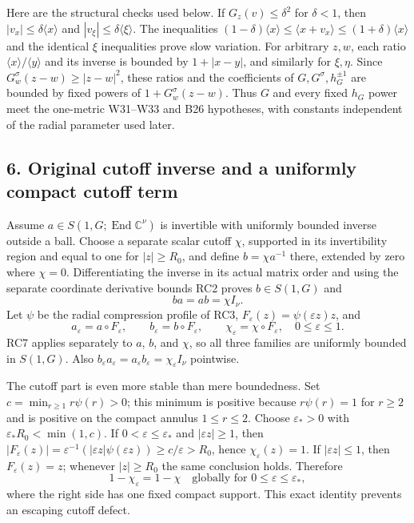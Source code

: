 \documentclass[
  11pt,
]{article}
\begin{document}
Here are the structural checks used below. If \(G_z(v)\le\delta^2\) for
\(\delta<1\), then \(|v_x|\le\delta\langle x\rangle\) and
\(|v_\xi|\le\delta\langle\xi\rangle\). The inequalities
\((1-\delta)\langle x\rangle\le\langle x+v_x\rangle\le(1+\delta)\langle x\rangle\)
and the identical \(\xi\) inequalities prove slow variation. For
arbitrary \(z,w\), each ratio \(\langle x\rangle/\langle y\rangle\) and
its inverse is bounded by \(1+|x-y|\), and similarly for \(\xi,\eta\).
Since \(G_w^\sigma(z-w)\ge|z-w|^2\), these ratios and the coefficients
of \(G,G^\sigma,h_G^{\pm1}\) are bounded by fixed powers of
\(1+G_w^\sigma(z-w)\). Thus \(G\) and every fixed \(h_G\) power meet the
one-metric W31--W33 and B26 hypotheses, with constants independent of
the radial parameter used later.

\subsection{6. Original cutoff inverse and a uniformly compact cutoff
term}\label{original-cutoff-inverse-and-a-uniformly-compact-cutoff-term}

Assume \(a\in S(1,G;\operatorname{End}\mathbb C^\nu)\) is invertible
with uniformly bounded inverse outside a ball. Choose a separate scalar
cutoff \(\chi\), supported in its invertibility region and equal to one
for \(|z|\ge R_0\), and define \(b=\chi a^{-1}\) there, extended by zero
where \(\chi=0\). Differentiating the inverse in its actual matrix order
and using the separate coordinate derivative bounds RC2 proves
\(b\in S(1,G)\) and \[
 ba=ab=\chi I_\nu .
 \tag{PT2}
\] Let \(\psi\) be the radial compression profile of RC3,
\(F_\varepsilon(z)=\psi(\varepsilon z)z\), and \[
 a_\varepsilon=a\circ F_\varepsilon,\qquad
 b_\varepsilon=b\circ F_\varepsilon,\qquad
 \chi_\varepsilon=\chi\circ F_\varepsilon,
 \quad 0\le\varepsilon\le1.
 \tag{PT3}
\] RC7 applies separately to \(a\), \(b\), and \(\chi\), so all three
families are uniformly bounded in \(S(1,G)\). Also
\(b_\varepsilon a_\varepsilon=a_\varepsilon b_\varepsilon=\chi_\varepsilon I_\nu\)
pointwise.

The cutoff part is even more stable than mere boundedness. Set
\(c=\min_{r\ge1}r\psi(r)>0\); this minimum is positive because
\(r\psi(r)=1\) for \(r\ge2\) and is positive on the compact annulus
\(1\le r\le2\). Choose \(\varepsilon_*>0\) with
\(\varepsilon_*R_0<\min(1,c)\). If \(0<\varepsilon\le\varepsilon_*\) and
\(|\varepsilon z|\ge1\), then
\(|F_\varepsilon(z)|=\varepsilon^{-1}(|\varepsilon z|\psi(\varepsilon z))\ge c/\varepsilon>R_0\),
hence \(\chi_\varepsilon(z)=1\). If \(|\varepsilon z|\le1\), then
\(F_\varepsilon(z)=z\); whenever \(|z|\ge R_0\) the same conclusion
holds. Therefore \[
 1-\chi_\varepsilon=1-\chi
       \quad\text{globally for }0\le\varepsilon\le\varepsilon_*,
 \tag{PT4}
\] where the right side has one fixed compact support. This exact
identity prevents an escaping cutoff defect.
\end{document}
